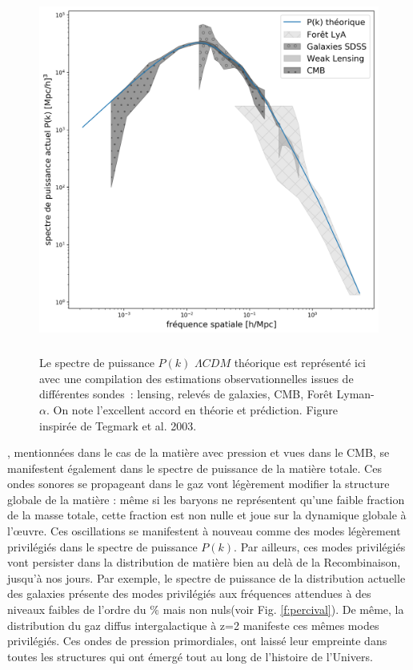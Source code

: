 \begin{figure}[htbp]
	\centering
		\includegraphics[height=12cm]{figs/pstegmark.png}
		\caption[Le spectre de puissance observé]{Le spectre de puissance $P(k)$ $\Lambda CDM$ théorique est représenté ici avec une compilation des estimations observationnelles issues de différentes sondes~: lensing, relevés de galaxies, CMB, Forêt Lyman-$\alpha$. On note l'excellent accord en théorie et prédiction.  Figure inspirée de Tegmark et al. 2003. }
	\label{f:pktegmark}
\end{figure}


, mentionnées dans le cas de la matière avec pression et vues dans le CMB, se manifestent également dans le spectre de puissance de la matière totale. Ces ondes sonores se propageant dans le gaz vont légèrement modifier la structure globale de la matière : même si les baryons ne représentent qu'une faible fraction de la masse totale, cette fraction est non nulle et joue sur la dynamique globale à l'œuvre. Ces oscillations se manifestent à nouveau comme des modes légèrement privilégiés dans le spectre de puissance $P(k)$. Par ailleurs, ces modes privilégiés vont persister dans la distribution de matière bien au delà de la Recombinaison, jusqu'à nos jours. Par exemple, le spectre de puissance de la distribution actuelle des galaxies  présente des modes privilégiés aux fréquences attendues à des niveaux faibles de l'ordre du $\%$ mais non nuls(voir Fig. \ref{f:percival}). De même, la distribution du gaz diffus intergalactique à z=2 manifeste ces mêmes modes privilégiés. Ces ondes de pression primordiales, ont laissé leur empreinte dans toutes les structures qui ont émergé tout au long de l'histoire de l'Univers.

